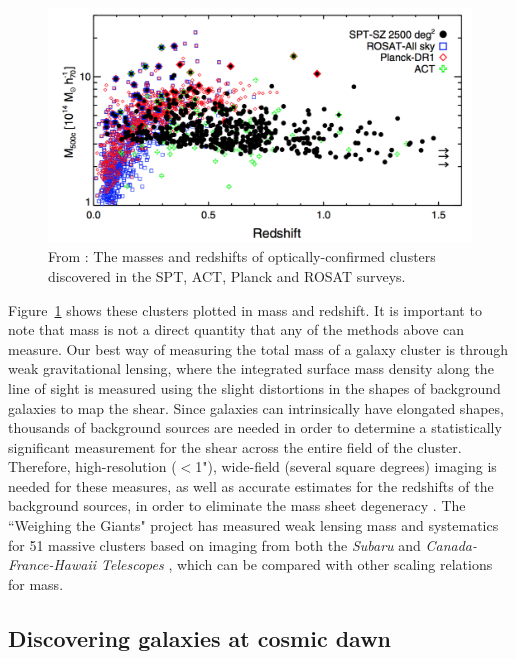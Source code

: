 \begin{figure}
\centering
\includegraphics[width=\textwidth]{Intro/spt.png}
\caption[Masses and redshifts of cluster detections]{From \citet{Bleem:2015gf}: The masses and redshifts of optically-confirmed clusters discovered in the SPT, ACT, Planck and ROSAT surveys.}
\label{intro:fig:cluster_detections}
\end{figure}

Figure~\ref{intro:fig:cluster_detections} shows these clusters plotted in mass and redshift. It is important to note that mass is not a direct quantity that any of the methods above can measure. Our best way of measuring the total mass of a galaxy cluster is through weak gravitational lensing, where the integrated surface mass density along the line of sight is measured using the slight distortions in the shapes of background galaxies to map the shear. Since galaxies can intrinsically have elongated shapes, thousands of background sources are needed in order to determine a statistically significant measurement for the shear across the entire field of the cluster. Therefore, high-resolution ($<$1"), wide-field (several square degrees) imaging is needed for these measures, as well as accurate estimates for the redshifts of the background sources, in order to eliminate the mass sheet degeneracy \citep{Schneider:1995vn}. The ``Weighing the Giants" project has measured weak lensing mass and systematics for 51 massive clusters based on imaging from both the {\it Subaru} and {\it Canada-France-Hawaii Telescopes} \citep{von-der-Linden:2014wd}, which can be compared with other scaling relations for mass.

\subsection{Discovering galaxies at cosmic dawn}

